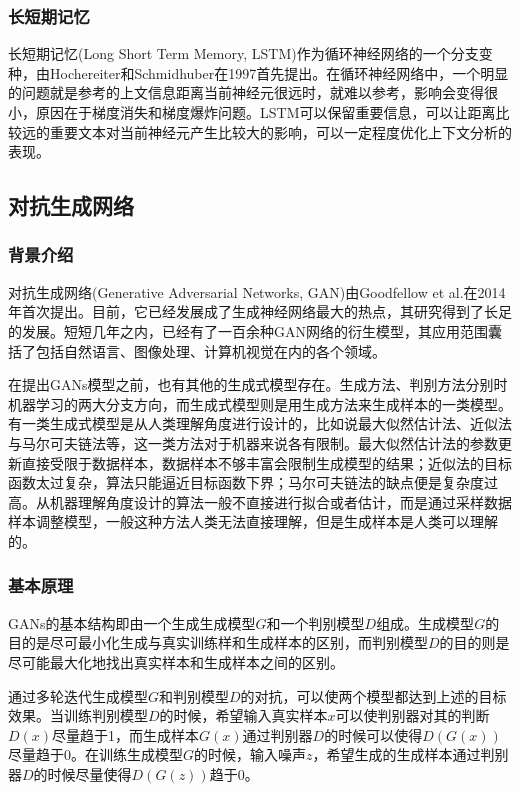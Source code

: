 \subsubsection{长短期记忆}
长短期记忆(Long Short Term Memory, LSTM)作为循环神经网络的一个分支变种，由Hochereiter和Schmidhuber在1997首先提出。在循环神经网络中，一个明显的问题就是参考的上文信息距离当前神经元很远时，就难以参考，影响会变得很小，原因在于梯度消失和梯度爆炸问题。LSTM可以保留重要信息，可以让距离比较远的重要文本对当前神经元产生比较大的影响，可以一定程度优化上下文分析的表现。

\subsection{对抗生成网络}
\subsubsection{背景介绍}
对抗生成网络(Generative Adversarial Networks, GAN)由Goodfellow et al.在2014年首次提出。目前，它已经发展成了生成神经网络最大的热点，其研究得到了长足的发展。短短几年之内，已经有了一百余种GAN网络的衍生模型，其应用范围囊括了包括自然语言、图像处理、计算机视觉在内的各个领域。

在提出GANs模型之前，也有其他的生成式模型存在。生成方法、判别方法分别时机器学习的两大分支方向，而生成式模型则是用生成方法来生成样本的一类模型。有一类生成式模型是从人类理解角度进行设计的，比如说最大似然估计法、近似法与马尔可夫链法等，这一类方法对于机器来说各有限制。最大似然估计法的参数更新直接受限于数据样本，数据样本不够丰富会限制生成模型的结果；近似法的目标函数太过复杂，算法只能逼近目标函数下界；马尔可夫链法的缺点便是复杂度过高。从机器理解角度设计的算法一般不直接进行拟合或者估计，而是通过采样数据样本调整模型，一般这种方法人类无法直接理解，但是生成样本是人类可以理解的。

\subsubsection{基本原理}
GANs的基本结构即由一个生成生成模型$G$和一个判别模型$D$组成。生成模型$G$的目的是尽可最小化生成与真实训练样和生成样本的区别，而判别模型$D$的目的则是尽可能最大化地找出真实样本和生成样本之间的区别。

通过多轮迭代生成模型$G$和判别模型$D$的对抗，可以使两个模型都达到上述的目标效果。当训练判别模型$D$的时候，希望输入真实样本$x$可以使判别器对其的判断$D(x)$尽量趋于1，而生成样本$G(x)$通过判别器$D$的时候可以使得$D(G(x))$尽量趋于0。在训练生成模型$G$的时候，输入噪声$z$，希望生成的生成样本通过判别器$D$的时候尽量使得$D(G(z))$趋于0。

